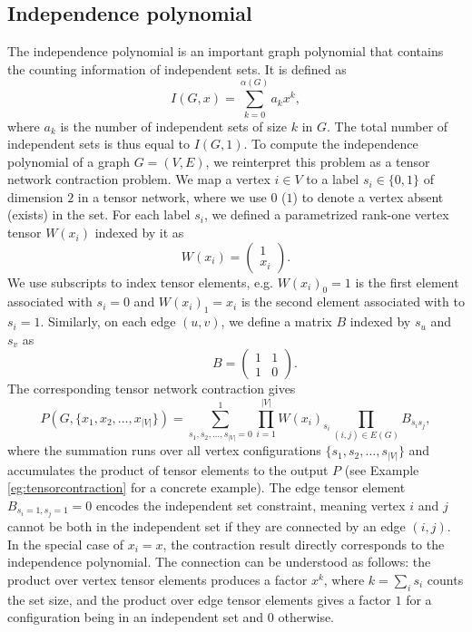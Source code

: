 \documentclass[onefignum, onetabnum]{siamart190516}
\newcommand{\<}{\langle}
\renewcommand{\>}{\rangle}
\newcounter{example}
\begin{document}
\subsection{Independence polynomial}\label{sec:indpoly}
The independence polynomial is an important graph polynomial that contains the counting information of independent sets. It is defined as
\begin{equation}\label{eq:idpdef}
I(G, x) = \sum_{k=0}^{\alpha(G)} a_k x^k,
\end{equation}
where $a_k$ is the number of independent sets of size $k$ in $G$. The total number of independent sets is thus equal to $I(G, 1)$.
To compute the independence polynomial of a graph $G = (V, E)$, we reinterpret this problem as a tensor network contraction problem.
We map a vertex $i\in V$ to a label $s_i \in \{0, 1\}$ of dimension $2$ in a tensor network, where we use $0$ ($1$) to denote a vertex absent (exists) in the set.
For each label $s_i$, we defined a parametrized rank-one vertex tensor $W(x_i)$ indexed by it as
\begin{equation}
    W(x_i) = \left(\begin{matrix}
        1 \\
        x_i
    \end{matrix}\right).
\end{equation}
We use subscripts to index tensor elements, e.g. $W(x_i)_0=1$ is the first element associated with $s_i=0$ and $W(x_i)_1=x_i$ is the second element associated with to $s_i=1$.
Similarly, on each edge $(u, v)$, we define a matrix $B$ indexed by $s_u$ and $s_v$ as
\begin{equation}
    \qquad \quad 
       B = \left(\begin{matrix}
        1  & 1\\
        1 & 0
    \end{matrix}\right). \label{eq:edgetensor}
\end{equation}
The corresponding tensor network contraction gives
\begin{equation}\label{eq:idp}
    P(G, \{x_1, x_{2}, \ldots,x_{|V|}\}) = \sum\limits_{s_1, s_2, \ldots, s_{|V|} = 0}^{1} \prod\limits_{i=1}^{|V|} W(x_i)_{s_i} \prod\limits_{(i,j) \in E(G)} B_{s_i s_j},
\end{equation}
where the summation runs over all vertex configurations $\{s_1, s_{2}, \ldots,s_{|V|}\}$ and accumulates the product of tensor elements to the output $P$ (see Example \ref{eg:tensorcontraction} for a concrete example).
The edge tensor element $B_{s_{i}=1, s_{j}=1} = 0$ encodes the independent set constraint, meaning vertex $i$ and $j$ cannot be both in the independent set if they are connected by an edge $(i,j)$.
In the special case of $x_i = x$, the contraction result directly corresponds to the independence polynomial.
The connection can be understood as follows: the product over vertex tensor elements produces a factor $x^k$, where $k=\sum_i s_i$ counts the set size,
and the product over edge tensor elements gives a factor $1$ for a configuration being in an independent set and $0$ otherwise.
\end{document}
